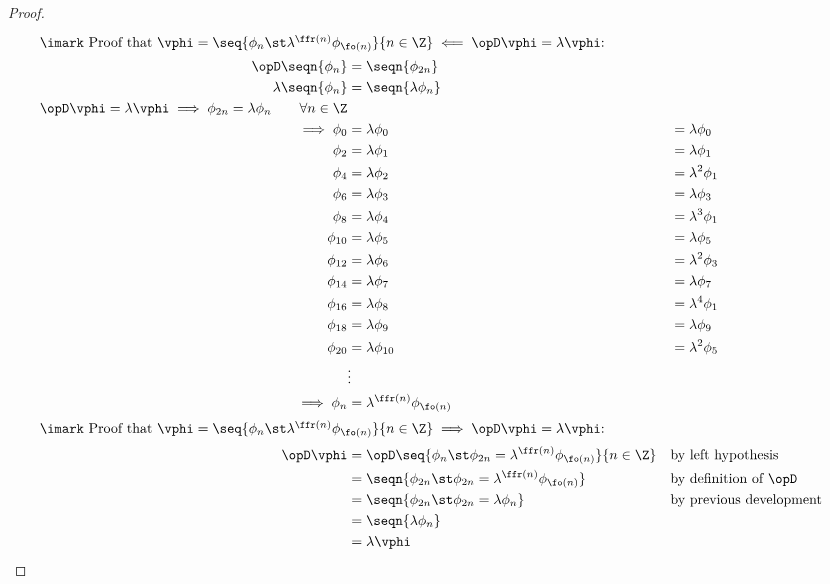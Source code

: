 \begin{proof}
\begin{align*}
  \intertext{$\imark$ Proof that 
    $\vphi= \seq{\phi_n \st \lambda^{\ffr(n)} \phi_{\fo(n)}}{n\in\Z}
     \impliedby
     \opD\vphi = \lambda\vphi
    $:}
  \opD\seqn{\phi_n} &= \seqn{\phi_{2n}} \\
  \lambda \seqn{\phi_n} &= \seqn{\lambda\phi_n}
  \\ \opD\vphi = \lambda\vphi \implies \phi_{2n} = \lambda\phi_n \qquad \forall n\in\Z
  \\ \implies \phi_{0 } &= \lambda \phi_0    &&= \lambda   \phi_0
  \\          \phi_{2 } &= \lambda \phi_1    &&= \lambda   \phi_1
  \\          \phi_{4 } &= \lambda \phi_2    &&= \lambda^2 \phi_1
  \\          \phi_{6 } &= \lambda \phi_3    &&= \lambda   \phi_3
  \\          \phi_{8 } &= \lambda \phi_4    &&= \lambda^3 \phi_1 
  \\          \phi_{10} &= \lambda \phi_5    &&= \lambda   \phi_5
  \\          \phi_{12} &= \lambda \phi_6    &&= \lambda^2 \phi_3 
  \\          \phi_{14} &= \lambda \phi_7    &&= \lambda   \phi_7
  \\          \phi_{16} &= \lambda \phi_8    &&= \lambda^4 \phi_1 
  \\          \phi_{18} &= \lambda \phi_9    &&= \lambda   \phi_9
  \\          \phi_{20} &= \lambda \phi_{10} &&= \lambda^2 \phi_5
  \\                  & \vdots
  \\ \implies \phi_n  &= \lambda^{\ffr(n)} \phi_{\fo(n)} 
  \\
  \intertext{$\imark$ Proof that 
    $\vphi= \seq{\phi_n \st \lambda^{\ffr(n)} \phi_{\fo(n)}}{n\in\Z}
     \implies
     \opD\vphi = \lambda\vphi
    $:}
  \opD\vphi
    &= \opD\seq{\phi_n \st \phi_{2n}=\lambda^{\ffr(n)} \phi_{\fo(n)}}{n\in\Z}
    && \text{by left hypothesis}
  \\&= \seqn{\phi_{2n} \st \phi_{2n}=\lambda^{\ffr(n)} \phi_{\fo(n)}}
    && \text{by definition of $\opD$}
  \\&= \seqn{\phi_{2n} \st \phi_{2n}=\lambda \phi_n}
    && \text{by previous development}
  \\&= \seqn{\lambda \phi_n}
  \\&= \lambda \vphi
\end{align*}
\end{proof}





